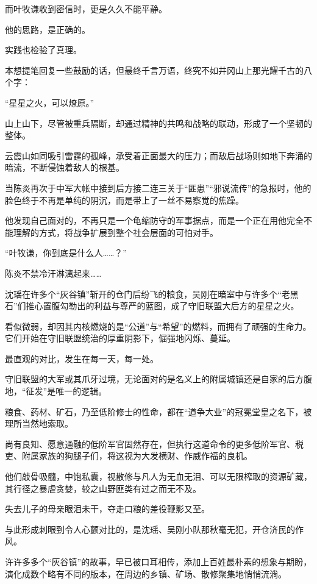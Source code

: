 而叶牧谦收到密信时，更是久久不能平静。

他的思路，是正确的。

实践也检验了真理。

本想提笔回复一些鼓励的话，但最终千言万语，终究不如井冈山上那光耀千古的八个字：

“星星之火，可以燎原。”

山上山下，尽管被重兵隔断，却通过精神的共鸣和战略的联动，形成了一个坚韧的整体。

云霞山如同吸引雷霆的孤峰，承受着正面最大的压力；而敌后战场则如地下奔涌的暗流，不断侵蚀着敌人的根基。

当陈炎再次于中军大帐中接到后方接二连三关于“匪患”“邪说流传”的急报时，他的脸色终于不再是单纯的阴沉，而是带上了一丝不易察觉的焦躁。

他发现自己面对的，不再只是一个龟缩防守的军事据点，而是一个正在用他完全不能理解的方式，将战争扩展到整个社会层面的可怕对手。

“叶牧谦，你到底是什么人……？”

陈炎不禁冷汗淋漓起来……

\vspace{2em}

沈瑶在许多个“灰谷镇”斩开的仓门后纷飞的粮食，吴刚在暗室中与许多个“老黑石”们推心置腹勾勒出的利益与尊严的蓝图，成了守旧联盟大后方的星星之火。

看似微弱，却因其内核燃烧的是“公道”与“希望”的燃料，而拥有了顽强的生命力。它们开始在守旧联盟统治的厚重阴影下，倔强地闪烁、蔓延。

最直观的对比，发生在每一天，每一处。

守旧联盟的大军或其爪牙过境，无论面对的是名义上的附属城镇还是自家的后方腹地，“征发”是唯一的逻辑。

粮食、药材、矿石，乃至低阶修士的性命，都在“道争大业”的冠冕堂皇之名下，被理所当然地索取。

尚有良知、愿意通融的低阶军官固然存在，但执行这道命令的更多低阶军官、税吏、附属家族的狗腿子们，将这视为大发横财、作威作福的良机。

他们敲骨吸髓，中饱私囊，视散修与凡人为无血无泪、可以无限榨取的资源矿藏，其行径之暴虐贪婪，较之山野匪类有过之而无不及。

失去儿子的母亲眼泪未干，夺走口粮的差役鞭影又至。

与此形成刺眼到令人心颤对比的，是沈瑶、吴刚小队那秋毫无犯，开仓济民的作风。

许许多多个“灰谷镇”的故事，早已被口耳相传，添加上百姓最朴素的想象与期盼，演化成数个略有不同的版本，在周边的乡镇、矿场、散修聚集地悄悄流淌。

